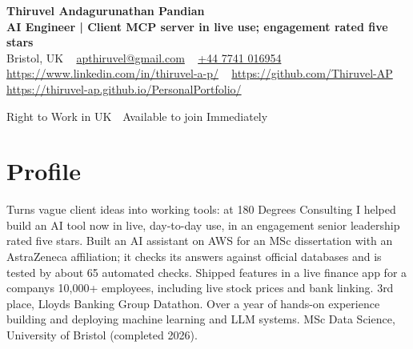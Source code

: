 \documentclass[a4paper,11pt]{article}
\begin{document}
\begin{center}
  {\LARGE\bfseries Thiruvel Andagurunathan Pandian} \\[3pt]
  {\color{headernavy}\small\textbf{AI Engineer | Client MCP server in live use; engagement rated five stars}} \\[3pt]
  {\small
  Bristol, UK\nobreak\ \,\textbar\, \href{mailto:apthiruvel@gmail.com}{apthiruvel@gmail.com}\nobreak\ \,\textbar\, \href{tel:+447741016954}{+44 7741 016954}\nobreak\ \,\textbar\, \href{https://www.linkedin.com/in/thiruvel-a-p/}{https://www.linkedin.com/in/thiruvel-a-p/}\nobreak\ \,\textbar\, \href{https://github.com/Thiruvel-AP}{https://github.com/Thiruvel-AP}\nobreak\ \,\textbar\, \href{https://thiruvel-ap.github.io/PersonalPortfolio/}{https://thiruvel-ap.github.io/PersonalPortfolio/}}\par\vspace{4pt}
  \noindent{} Right to Work in UK \,\textbar\, Available to join Immediately
\end{center}

\section{Profile}
Turns vague client ideas into working tools: at 180 Degrees Consulting I helped build an AI tool now in live, day-to-day use, in an engagement senior leadership rated five stars. Built an AI assistant on AWS for an MSc dissertation with an AstraZeneca affiliation; it checks its answers against official databases and is tested by about 65 automated checks. Shipped features in a live finance app for a company\textquotesingle{}s 10,000+ employees, including live stock prices and bank linking. 3rd place, Lloyd\textquotesingle{}s Banking Group Datathon. Over a year of hands-on experience building and deploying machine learning and LLM systems. MSc Data Science, University of Bristol (completed 2026).
\end{document}
